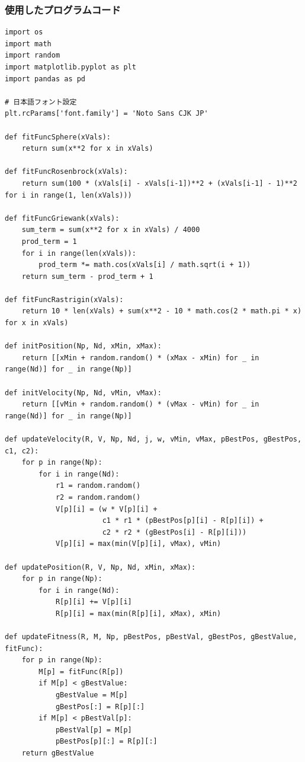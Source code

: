 \newpage
\subsubsection{使用したプログラムコード}

\begin{lstlisting}[caption=PSOによるベンチマーク関数の最適化, label=lst:pso_code]
import os
import math
import random
import matplotlib.pyplot as plt
import pandas as pd

# 日本語フォント設定
plt.rcParams['font.family'] = 'Noto Sans CJK JP'

def fitFuncSphere(xVals):
    return sum(x**2 for x in xVals)

def fitFuncRosenbrock(xVals):
    return sum(100 * (xVals[i] - xVals[i-1])**2 + (xVals[i-1] - 1)**2 for i in range(1, len(xVals)))

def fitFuncGriewank(xVals):
    sum_term = sum(x**2 for x in xVals) / 4000
    prod_term = 1
    for i in range(len(xVals)):
        prod_term *= math.cos(xVals[i] / math.sqrt(i + 1))
    return sum_term - prod_term + 1

def fitFuncRastrigin(xVals):
    return 10 * len(xVals) + sum(x**2 - 10 * math.cos(2 * math.pi * x) for x in xVals)

def initPosition(Np, Nd, xMin, xMax):
    return [[xMin + random.random() * (xMax - xMin) for _ in range(Nd)] for _ in range(Np)]

def initVelocity(Np, Nd, vMin, vMax):
    return [[vMin + random.random() * (vMax - vMin) for _ in range(Nd)] for _ in range(Np)]

def updateVelocity(R, V, Np, Nd, j, w, vMin, vMax, pBestPos, gBestPos, c1, c2):
    for p in range(Np):
        for i in range(Nd):
            r1 = random.random()
            r2 = random.random()
            V[p][i] = (w * V[p][i] +
                       c1 * r1 * (pBestPos[p][i] - R[p][i]) +
                       c2 * r2 * (gBestPos[i] - R[p][i]))
            V[p][i] = max(min(V[p][i], vMax), vMin)

def updatePosition(R, V, Np, Nd, xMin, xMax):
    for p in range(Np):
        for i in range(Nd):
            R[p][i] += V[p][i]
            R[p][i] = max(min(R[p][i], xMax), xMin)

def updateFitness(R, M, Np, pBestPos, pBestVal, gBestPos, gBestValue, fitFunc):
    for p in range(Np):
        M[p] = fitFunc(R[p])
        if M[p] < gBestValue:
            gBestValue = M[p]
            gBestPos[:] = R[p][:]
        if M[p] < pBestVal[p]:
            pBestVal[p] = M[p]
            pBestPos[p][:] = R[p][:]
    return gBestValue


\end{lstlisting}

